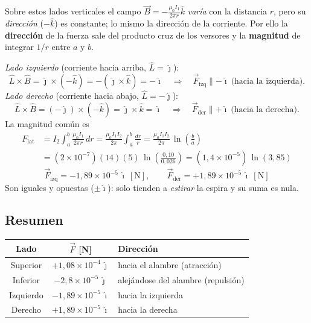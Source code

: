 \documentclass[12pt,letterpaper]{article}
\begin{document}
Sobre estos lados verticales el campo $\vec{B}=-\frac{\mu_0 I_1}{2\pi r}\hat{k}$ \emph{var\'ia}
con la distancia $r$, pero su \emph{direcci\'on} ($-\hat{k}$) es constante; lo mismo la
direcci\'on de la corriente. Por ello la \textbf{direcci\'on} de la fuerza sale del producto cruz
de los versores y la \textbf{magnitud} de integrar $1/r$ entre $a$ y $b$.

\medskip

\noindent\emph{Lado izquierdo} (corriente hacia arriba, $\hat{L}=\hat{\jmath}$):
\[
    \hat{L}\times\hat{B} = \hat{\jmath}\times(-\hat{k}) = -(\hat{\jmath}\times\hat{k}) = -\hat{\imath}
    \quad\Rightarrow\quad \vec{F}_{\text{izq}}\parallel -\hat{\imath}\ \text{(hacia la izquierda).}
\]
\noindent\emph{Lado derecho} (corriente hacia abajo, $\hat{L}=-\hat{\jmath}$):
\[
    \hat{L}\times\hat{B} = (-\hat{\jmath})\times(-\hat{k}) = \hat{\jmath}\times\hat{k} = \hat{\imath}
    \quad\Rightarrow\quad \vec{F}_{\text{der}}\parallel +\hat{\imath}\ \text{(hacia la derecha).}
\]
La magnitud com\'un es
\begin{align*}
    F_{\text{lat}} &= I_2\!\int_a^b \frac{\mu_0 I_1}{2\pi r}\,dr
    = \frac{\mu_0 I_1 I_2}{2\pi}\int_a^b \frac{dr}{r}
    = \frac{\mu_0 I_1 I_2}{2\pi}\,\ln\!\left(\frac{b}{a}\right) \\[2pt]
    &= (2\times10^{-7})(14)(5)\,\ln\!\left(\frac{0{,}10}{0{,}026}\right)
    = (1{,}4\times10^{-5})\,\ln(3{,}85)
\end{align*}
\[
    \boxed{\vec{F}_{\text{izq}} = -1{,}89\times10^{-5}\,\hat{\imath}\ [\text{N}],\qquad
           \vec{F}_{\text{der}} = +1{,}89\times10^{-5}\,\hat{\imath}\ [\text{N}]}
\]
Son iguales y opuestas ($\pm\hat{\imath}$): solo tienden a \emph{estirar} la espira y su suma es nula.

\subsection*{Resumen}

\begin{center}
\renewcommand{\arraystretch}{1.3}
\begin{tabular}{|c|c|l|}
\hline
\textbf{Lado} & \textbf{$\vec{F}$ [N]} & \textbf{Direcci\'on} \\
\hline
Superior  & $+1{,}08\times10^{-4}\,\hat{\jmath}$ & hacia el alambre (atracci\'on) \\
Inferior  & $-2{,}8\times10^{-5}\,\hat{\jmath}$  & alej\'andose del alambre (repulsi\'on) \\
Izquierdo & $-1{,}89\times10^{-5}\,\hat{\imath}$ & hacia la izquierda \\
Derecho   & $+1{,}89\times10^{-5}\,\hat{\imath}$ & hacia la derecha \\
\hline
\end{tabular}
\end{center}
\end{document}
